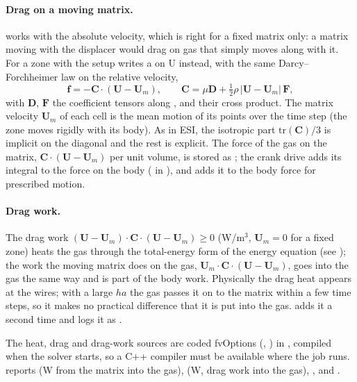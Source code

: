 \paragraph{Drag on a moving matrix.}  works with the absolute velocity, which is right for a fixed matrix only: a matrix moving with the displacer would drag on gas that simply moves along with it. For a zone with  the setup writes a  on U instead, with the same Darcy--Forchheimer law on the relative velocity,
\begin{equation}
\mathbf{f} = -\mathbf{C}\cdot(\mathbf{U} - \mathbf{U}_m), \qquad \mathbf{C} = \mu \mathbf{D} + \tfrac{1}{2}\rho\,|\mathbf{U} - \mathbf{U}_m|\,\mathbf{F} ,
\end{equation}
with $\mathbf{D}$, $\mathbf{F}$ the coefficient tensors along ,  and their cross product. The matrix velocity $\mathbf{U}_m$ of each cell is the mean motion of its points over the time step (the zone moves rigidly with its body). As in ESI, the isotropic part $\mathrm{tr}(\mathbf{C})/3$ is implicit on the diagonal and the rest is explicit. The force of the gas on the matrix, $\mathbf{C}\cdot(\mathbf{U} - \mathbf{U}_m)$ per unit volume, is stored as ; the crank drive adds its integral to the force on the body ( in ), and  adds it to the body force for prescribed motion.

\paragraph{Drag work.} The drag work $(\mathbf{U} - \mathbf{U}_m)\cdot\mathbf{C}\cdot(\mathbf{U} - \mathbf{U}_m) \ge 0$ (W/m$^3$, $\mathbf{U}_m = 0$ for a fixed zone) heats the gas through the total-energy form of the energy equation (see ); the work the moving matrix does on the gas, $\mathbf{U}_m\cdot\mathbf{C}\cdot(\mathbf{U} - \mathbf{U}_m)$, goes into the gas the same way and is part of the body work. Physically the drag heat appears at the wires; with a large $h a$ the gas passes it on to the matrix within a few time steps, so it makes no practical difference that it is put into the gas.  adds it a second time and logs it as .

The heat, drag and drag-work sources are coded fvOptions (, ) in , compiled when the solver starts, so a C++ compiler must be available where the job runs.  reports  (W from the matrix into the gas),  (W, drag work into the gas), ,  and .

